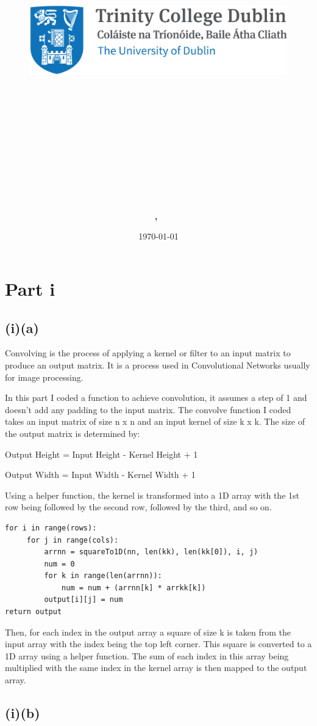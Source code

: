 \documentclass{article}
\title{
\vspace{-1in}
\begin{figure}[!ht]
\flushleft
\includegraphics[width=0.4\linewidth]{reduced-trinity.png}
\end{figure}
\vspace{-0.5cm}
\hrulefill \\
\vspace{0.5cm}
\textmd{\textbf{\moduleCode\ \moduleName}}\\
\textmd{\textbf{\assignmentTitle}}\\
\vspace{0.5cm}
\hrulefill \\
}
\author{\textbf{\authorName,\ \authorID}}
\date{\today}
\begin{document}
\captionsetup{width=.8\linewidth} 

\maketitle



\section{Part i }

\subsection{(i)(a)}
Convolving is the process of applying a kernel or filter to an input matrix to produce an output matrix. It is a process used in Convolutional Networks usually for image processing. 

In this part I coded a function to achieve convolution, it assumes a step of 1 and doesn't add any padding to the input matrix. The convolve function I coded takes an input matrix of size n x n and an input kernel of size k x k. The size of the output matrix is determined by:
\begin{center}
Output Height = Input Height - Kernel Height + 1

Output Width = Input Width - Kernel Width + 1
\end{center}
Using a helper function, the kernel is transformed into a 1D array with the 1st row being followed by the second row, followed by the third, and so on. 

\begin{lstlisting}
for i in range(rows):
     for j in range(cols):
         arrnn = squareTo1D(nn, len(kk), len(kk[0]), i, j)
         num = 0
         for k in range(len(arrnn)):
             num = num + (arrnn[k] * arrkk[k])
         output[i][j] = num
return output
\end{lstlisting}
Then, for each index in the output array a square of size k is taken from the input array with the index being the top left corner. This square is converted to a 1D array using a helper function. The sum of each index in this array being multiplied with the same index in the kernel array is then mapped to the output array. 

\subsection{(i)(b)}
\end{document}
